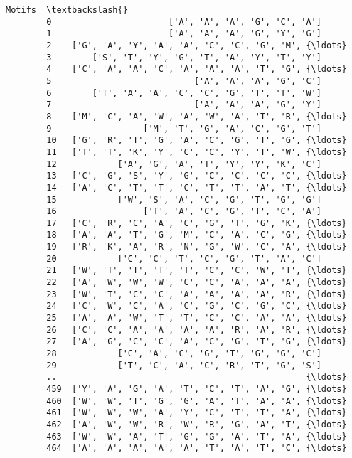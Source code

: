 \documentclass[11pt]{article}
\begin{document}
\begin{Verbatim}[commandchars=\\\{\}]
                                                        Motifs  \textbackslash{}
        0                       ['A', 'A', 'A', 'G', 'C', 'A']   
        1                       ['A', 'A', 'A', 'G', 'Y', 'G']   
        2    ['G', 'A', 'Y', 'A', 'A', 'C', 'C', 'G', 'M', {\ldots}   
        3        ['S', 'T', 'Y', 'G', 'T', 'A', 'Y', 'T', 'Y']   
        4    ['C', 'A', 'A', 'C', 'A', 'A', 'A', 'T', 'G', {\ldots}   
        5                            ['A', 'A', 'A', 'G', 'C']   
        6        ['T', 'A', 'A', 'C', 'C', 'G', 'T', 'T', 'W']   
        7                            ['A', 'A', 'A', 'G', 'Y']   
        8    ['M', 'C', 'A', 'W', 'A', 'W', 'A', 'T', 'R', {\ldots}   
        9                  ['M', 'T', 'G', 'A', 'C', 'G', 'T']   
        10   ['G', 'R', 'T', 'G', 'A', 'C', 'G', 'T', 'G', {\ldots}   
        11   ['T', 'T', 'K', 'Y', 'C', 'C', 'Y', 'T', 'W', {\ldots}   
        12            ['A', 'G', 'A', 'T', 'Y', 'Y', 'K', 'C']   
        13   ['C', 'G', 'S', 'Y', 'G', 'C', 'C', 'C', 'C', {\ldots}   
        14   ['A', 'C', 'T', 'T', 'C', 'T', 'T', 'A', 'T', {\ldots}   
        15            ['W', 'S', 'A', 'C', 'G', 'T', 'G', 'G']   
        16                 ['T', 'A', 'C', 'G', 'T', 'C', 'A']   
        17   ['C', 'R', 'C', 'A', 'C', 'G', 'T', 'G', 'K', {\ldots}   
        18   ['A', 'A', 'T', 'G', 'M', 'C', 'A', 'C', 'G', {\ldots}   
        19   ['R', 'K', 'A', 'R', 'N', 'G', 'W', 'C', 'A', {\ldots}   
        20            ['C', 'C', 'T', 'C', 'G', 'T', 'A', 'C']   
        21   ['W', 'T', 'T', 'T', 'T', 'C', 'C', 'W', 'T', {\ldots}   
        22   ['A', 'W', 'W', 'W', 'C', 'C', 'A', 'A', 'A', {\ldots}   
        23   ['W', 'T', 'C', 'C', 'A', 'A', 'A', 'A', 'R', {\ldots}   
        24   ['C', 'W', 'C', 'A', 'C', 'G', 'C', 'G', 'C', {\ldots}   
        25   ['A', 'A', 'W', 'T', 'T', 'C', 'C', 'A', 'A', {\ldots}   
        26   ['C', 'C', 'A', 'A', 'A', 'A', 'R', 'A', 'R', {\ldots}   
        27   ['A', 'G', 'C', 'C', 'A', 'C', 'G', 'T', 'G', {\ldots}   
        28            ['C', 'A', 'C', 'G', 'T', 'G', 'G', 'C']   
        29            ['T', 'C', 'A', 'C', 'R', 'T', 'G', 'S']   
        ..                                                 {\ldots}   
        459  ['Y', 'A', 'G', 'A', 'T', 'C', 'T', 'A', 'G', {\ldots}   
        460  ['W', 'W', 'T', 'G', 'G', 'A', 'T', 'A', 'A', {\ldots}   
        461  ['W', 'W', 'W', 'A', 'Y', 'C', 'T', 'T', 'A', {\ldots}   
        462  ['A', 'W', 'W', 'R', 'W', 'R', 'G', 'A', 'T', {\ldots}   
        463  ['W', 'W', 'A', 'T', 'G', 'G', 'A', 'T', 'A', {\ldots}   
        464  ['A', 'A', 'A', 'A', 'A', 'T', 'A', 'T', 'C', {\ldots}   

\end{Verbatim}
\end{document}
